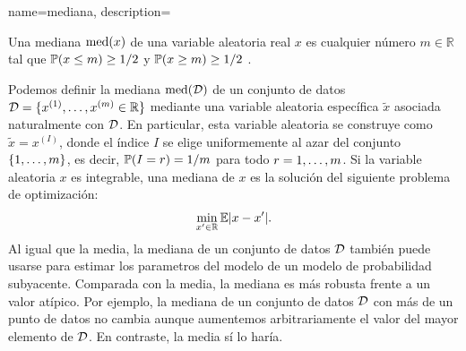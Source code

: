 {name={mediana}, 
 description={Una mediana $\med(x)$ de una variable aleatoria real $x$ 
 es cualquier número $m \in \mathbb{R}$ tal que $\prob{ x \leq m} \geq 1/2$ y $\prob{ x \geq m} \geq 1/2$ \cite{LC}.
 \begin{figure}[H]
	\begin{center}
\end{center}
 \end{figure}  
 Podemos definir la mediana $\med(\dataset)$ de un conjunto de datos
 $\dataset = \{ x^{(1)}, \ldots, x^{(\samplesize)} \in \mathbb{R} \}$ 
 mediante una variable aleatoria específica $\tilde{x}$ asociada naturalmente con $\dataset$. 
 En particular, esta variable aleatoria se construye como $\tilde{x} = x^{(I)}$, donde el índice $I$ 
 se elige uniformemente al azar del conjunto $\{1,\ldots,\samplesize\}$, es decir, 
 $\prob{I = \sampleidx} = 1/\samplesize$ para todo $\sampleidx = 1,\ldots,\samplesize$. 
 Si la variable aleatoria $x$ es integrable, una mediana de $x$ es la solución del siguiente problema de optimización: 
 $$\min_{x' \in \mathbb{R}} \expect{|x - x'|}.$$ 
 Al igual que la media, la mediana de un conjunto de datos $\dataset$ también puede usarse 
 para estimar los parametros del modelo de un modelo de probabilidad subyacente. Comparada con la media, 
 la mediana es más robusta frente a un valor atípico. Por ejemplo, la mediana de un conjunto de datos $\dataset$ 
 con más de un punto de datos no cambia aunque aumentemos arbitrariamente el valor del mayor elemento de $\dataset$. 
 En contraste, la media sí lo haría.
  	\begin{figure}[H]
		\centering
		\begin{tikzpicture}[scale=0.7, y=0.5cm, x=0.5cm]

\end{tikzpicture}
\end{figure}}}
